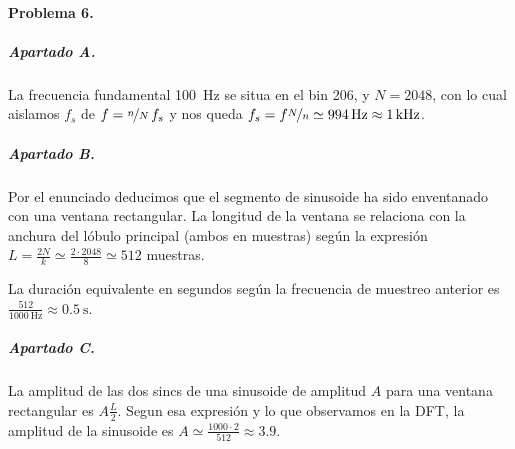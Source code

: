 \finishpage


\startpage
\paragraph{Problema 6.}

\subparagraph{Apartado A.}

La frecuencia fundamental \SI{100}{\hertz} se situa en el bin \num{206}, y
$N = 2048$, con lo cual aislamos $f_s$ de $f = \nicefrac{n}{N} \, f_s$ y nos
queda $f_s = f \nicefrac{N}{n} \simeq \SI{994}{\hertz} \approx
\SI{1}{\kilo\hertz}$.

\subparagraph{Apartado B.}

Por el enunciado deducimos que el segmento de sinusoide ha sido enventanado
con una ventana rectangular. La longitud de la ventana se relaciona con la
anchura del lóbulo principal (ambos en muestras) según la expresión
$L = \frac{2N}{k} \simeq \frac{2 \cdot 2048}{8} \simeq 512$ muestras.

La duración equivalente en segundos según la frecuencia de muestreo anterior
es $\frac{512}{\SI{1000}{\hertz}} \approx \SI{0.5}{\second}$.


\subparagraph{Apartado C.}

La amplitud de las dos sincs de una sinusoide de amplitud $A$ para una ventana
rectangular es $A \frac{L}{2}$. Segun esa expresión y lo que observamos en la
DFT, la amplitud de la sinusoide es $A \simeq \frac{1000 \cdot 2}{512} \approx
\num{3.9}$.

\finishpage

